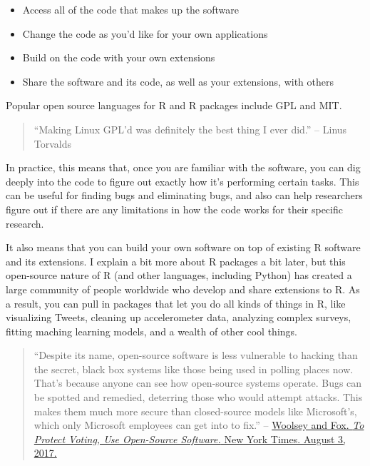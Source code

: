 \documentclass[]{book}
\providecommand{\tightlist}{%
  \setlength{\itemsep}{0pt}\setlength{\parskip}{0pt}}
\theoremstyle{definition}
\theoremstyle{definition}
\theoremstyle{definition}
\theoremstyle{remark}
\begin{document}
\begin{itemize}
\tightlist
\item
  Access all of the code that makes up the software
\item
  Change the code as you'd like for your own applications
\item
  Build on the code with your own extensions
\item
  Share the software and its code, as well as your extensions, with
  others
\end{itemize}

Popular open source languages for R and R packages include GPL and MIT.

\begin{quote}
``Making Linux GPL'd was definitely the best thing I ever did.'' --
Linus Torvalds
\end{quote}

In practice, this means that, once you are familiar with the software,
you can dig deeply into the code to figure out exactly how it's
performing certain tasks. This can be useful for finding bugs and
eliminating bugs, and also can help researchers figure out if there are
any limitations in how the code works for their specific research.

It also means that you can build your own software on top of existing R
software and its extensions. I explain a bit more about R packages a bit
later, but this open-source nature of R (and other languages, including
Python) has created a large community of people worldwide who develop
and share extensions to R. As a result, you can pull in packages that
let you do all kinds of things in R, like visualizing Tweets, cleaning
up accelerometer data, analyzing complex surveys, fitting maching
learning models, and a wealth of other cool things.

\begin{quote}
``Despite its name, open-source software is less vulnerable to hacking
than the secret, black box systems like those being used in polling
places now. That's because anyone can see how open-source systems
operate. Bugs can be spotted and remedied, deterring those who would
attempt attacks. This makes them much more secure than closed-source
models like Microsoft's, which only Microsoft employees can get into to
fix.'' --
\href{https://www.nytimes.com/2017/08/03/opinion/open-source-software-hacker-voting.html?mcubz=3}{Woolsey
and Fox. \emph{To Protect Voting, Use Open-Source Software.} New York
Times. August 3, 2017.}
\end{quote}
\end{document}
